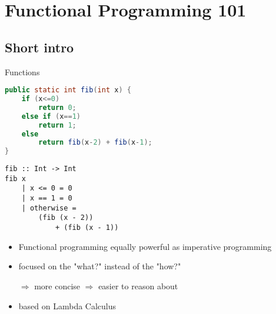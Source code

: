 \section{Functional Programming 101}
\subsection{Short intro}
\begin{frame}[fragile]{Functions}
\begin{minipage}{0.5\textwidth}
\begin{lstlisting}[frame=htrbl, language=java]
public static int fib(int x) {
	if (x<=0)
		return 0;
	else if (x==1)
		return 1;
	else
		return fib(x-2) + fib(x-1);
}
\end{lstlisting}
\end{minipage}
\hfill
\begin{minipage}{0.4\textwidth}
\begin{lstlisting}[frame=htrbl]
fib :: Int -> Int
fib x
	| x <= 0 = 0
	| x == 1 = 0
	| otherwise = 
		(fib (x - 2))
			+ (fib (x - 1))
\end{lstlisting}
\end{minipage}

\begin{itemize}
\item Functional programming equally powerful as imperative programming

\item focused on the "what?" instead of the "how?"

$\Rightarrow$ more concise $\Rightarrow$ easier to reason about

\item based on Lambda Calculus
\end{itemize}
\end{frame}